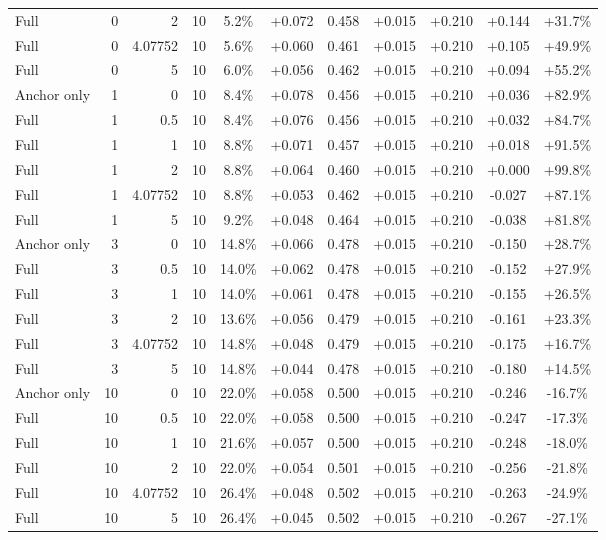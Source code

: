 \begin{table}[htbp]
\begin{tabular}{lrrrccccccc}
Full & 0 & 2 & 10 & 5.2\% & +0.072 & 0.458 & +0.015 & +0.210 & +0.144 & +31.7\% \\
Full & 0 & 4.07752 & 10 & 5.6\% & +0.060 & 0.461 & +0.015 & +0.210 & +0.105 & +49.9\% \\
Full & 0 & 5 & 10 & 6.0\% & +0.056 & 0.462 & +0.015 & +0.210 & +0.094 & +55.2\% \\
Anchor only & 1 & 0 & 10 & 8.4\% & +0.078 & 0.456 & +0.015 & +0.210 & +0.036 & +82.9\% \\
Full & 1 & 0.5 & 10 & 8.4\% & +0.076 & 0.456 & +0.015 & +0.210 & +0.032 & +84.7\% \\
Full & 1 & 1 & 10 & 8.8\% & +0.071 & 0.457 & +0.015 & +0.210 & +0.018 & +91.5\% \\
Full & 1 & 2 & 10 & 8.8\% & +0.064 & 0.460 & +0.015 & +0.210 & +0.000 & +99.8\% \\
Full & 1 & 4.07752 & 10 & 8.8\% & +0.053 & 0.462 & +0.015 & +0.210 & -0.027 & +87.1\% \\
Full & 1 & 5 & 10 & 9.2\% & +0.048 & 0.464 & +0.015 & +0.210 & -0.038 & +81.8\% \\
Anchor only & 3 & 0 & 10 & 14.8\% & +0.066 & 0.478 & +0.015 & +0.210 & -0.150 & +28.7\% \\
Full & 3 & 0.5 & 10 & 14.0\% & +0.062 & 0.478 & +0.015 & +0.210 & -0.152 & +27.9\% \\
Full & 3 & 1 & 10 & 14.0\% & +0.061 & 0.478 & +0.015 & +0.210 & -0.155 & +26.5\% \\
Full & 3 & 2 & 10 & 13.6\% & +0.056 & 0.479 & +0.015 & +0.210 & -0.161 & +23.3\% \\
Full & 3 & 4.07752 & 10 & 14.8\% & +0.048 & 0.479 & +0.015 & +0.210 & -0.175 & +16.7\% \\
Full & 3 & 5 & 10 & 14.8\% & +0.044 & 0.478 & +0.015 & +0.210 & -0.180 & +14.5\% \\
Anchor only & 10 & 0 & 10 & 22.0\% & +0.058 & 0.500 & +0.015 & +0.210 & -0.246 & -16.7\% \\
Full & 10 & 0.5 & 10 & 22.0\% & +0.058 & 0.500 & +0.015 & +0.210 & -0.247 & -17.3\% \\
Full & 10 & 1 & 10 & 21.6\% & +0.057 & 0.500 & +0.015 & +0.210 & -0.248 & -18.0\% \\
Full & 10 & 2 & 10 & 22.0\% & +0.054 & 0.501 & +0.015 & +0.210 & -0.256 & -21.8\% \\
Full & 10 & 4.07752 & 10 & 26.4\% & +0.048 & 0.502 & +0.015 & +0.210 & -0.263 & -24.9\% \\
Full & 10 & 5 & 10 & 26.4\% & +0.045 & 0.502 & +0.015 & +0.210 & -0.267 & -27.1\% \\

\end{tabular}
\end{table}
